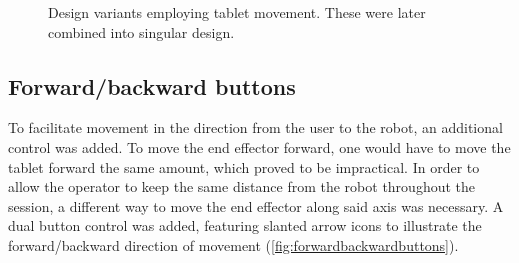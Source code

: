 \begin{figure}[H]
    \centering
    
    
    \caption{Design variants employing tablet movement. These were later combined into singular design.}
    \label{fig:EarlyDesigns2}
\end{figure}

\subsection{Forward/backward buttons}

To facilitate movement in the direction from the user to the robot, an additional control was added. To move the end effector forward, one would have to move the tablet forward the same amount, which proved to be impractical. In order to allow the operator to keep the same distance from the robot throughout the session, a different way to move the end effector along said axis was necessary. A dual button control was added, featuring slanted arrow icons to illustrate the forward/backward direction of movement (\ref{fig:forwardbackwardbuttons}). 

